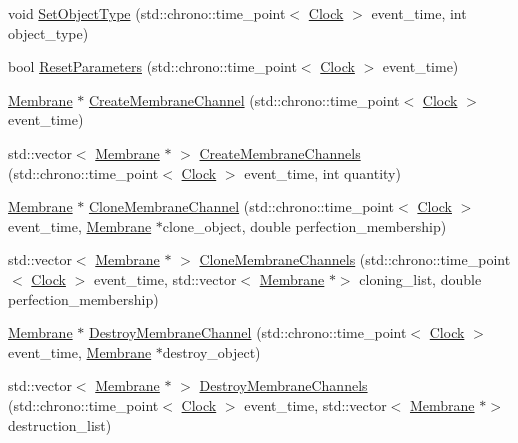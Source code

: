 \begin{DoxyCompactItemize}
\item 
void \mbox{\hyperlink{classMembrane_a5ba2bcb906f3984b28f1030207e106ad}{Set\+Object\+Type}} (std\+::chrono\+::time\+\_\+point$<$ \mbox{\hyperlink{universe_8h_a0ef8d951d1ca5ab3cfaf7ab4c7a6fd80}{Clock}} $>$ event\+\_\+time, int object\+\_\+type)
\item 
bool \mbox{\hyperlink{classMembrane_a9c49462cf63495381a52e2defc80b1e4}{Reset\+Parameters}} (std\+::chrono\+::time\+\_\+point$<$ \mbox{\hyperlink{universe_8h_a0ef8d951d1ca5ab3cfaf7ab4c7a6fd80}{Clock}} $>$ event\+\_\+time)
\item 
\mbox{\hyperlink{classMembrane}{Membrane}} $\ast$ \mbox{\hyperlink{classMembrane_a589b56529ac634a52b2a5fc78d356973}{Create\+Membrane\+Channel}} (std\+::chrono\+::time\+\_\+point$<$ \mbox{\hyperlink{universe_8h_a0ef8d951d1ca5ab3cfaf7ab4c7a6fd80}{Clock}} $>$ event\+\_\+time)
\item 
std\+::vector$<$ \mbox{\hyperlink{classMembrane}{Membrane}} $\ast$ $>$ \mbox{\hyperlink{classMembrane_a72987fae41e552af5befcd9a62aa6e46}{Create\+Membrane\+Channels}} (std\+::chrono\+::time\+\_\+point$<$ \mbox{\hyperlink{universe_8h_a0ef8d951d1ca5ab3cfaf7ab4c7a6fd80}{Clock}} $>$ event\+\_\+time, int quantity)
\item 
\mbox{\hyperlink{classMembrane}{Membrane}} $\ast$ \mbox{\hyperlink{classMembrane_a9514ca4d4378e6467d2059a9d5f9b99b}{Clone\+Membrane\+Channel}} (std\+::chrono\+::time\+\_\+point$<$ \mbox{\hyperlink{universe_8h_a0ef8d951d1ca5ab3cfaf7ab4c7a6fd80}{Clock}} $>$ event\+\_\+time, \mbox{\hyperlink{classMembrane}{Membrane}} $\ast$clone\+\_\+object, double perfection\+\_\+membership)
\item 
std\+::vector$<$ \mbox{\hyperlink{classMembrane}{Membrane}} $\ast$ $>$ \mbox{\hyperlink{classMembrane_aa9958ea461092c0d2aceb07c9c34373c}{Clone\+Membrane\+Channels}} (std\+::chrono\+::time\+\_\+point$<$ \mbox{\hyperlink{universe_8h_a0ef8d951d1ca5ab3cfaf7ab4c7a6fd80}{Clock}} $>$ event\+\_\+time, std\+::vector$<$ \mbox{\hyperlink{classMembrane}{Membrane}} $\ast$$>$ cloning\+\_\+list, double perfection\+\_\+membership)
\item 
\mbox{\hyperlink{classMembrane}{Membrane}} $\ast$ \mbox{\hyperlink{classMembrane_a12413d933a62b3bbb7931c6ab25de7de}{Destroy\+Membrane\+Channel}} (std\+::chrono\+::time\+\_\+point$<$ \mbox{\hyperlink{universe_8h_a0ef8d951d1ca5ab3cfaf7ab4c7a6fd80}{Clock}} $>$ event\+\_\+time, \mbox{\hyperlink{classMembrane}{Membrane}} $\ast$destroy\+\_\+object)
\item 
std\+::vector$<$ \mbox{\hyperlink{classMembrane}{Membrane}} $\ast$ $>$ \mbox{\hyperlink{classMembrane_aea71c4443f2fc22359ac3f770ff7755e}{Destroy\+Membrane\+Channels}} (std\+::chrono\+::time\+\_\+point$<$ \mbox{\hyperlink{universe_8h_a0ef8d951d1ca5ab3cfaf7ab4c7a6fd80}{Clock}} $>$ event\+\_\+time, std\+::vector$<$ \mbox{\hyperlink{classMembrane}{Membrane}} $\ast$$>$ destruction\+\_\+list)

\end{DoxyCompactItemize}
